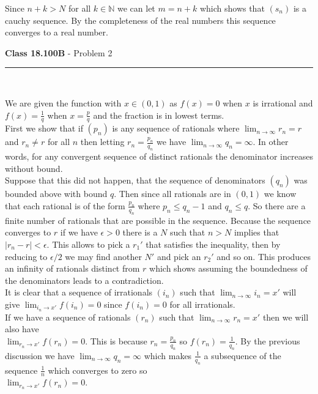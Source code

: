 \documentclass[11pt,reqno]{article}
\begin{document}
Since $n+k > N$ for all $k \in \mathbb{N}$ we can let $m = n+k$ which shows that $(s_n)$ is a cauchy sequence. By the completeness of the real numbers this sequence converges to a real number.


\newpage
\vspace{15pt}
\begin{flushleft} 
\textbf{Class 18.100B} - Problem 2\\
\rule{500pt}{1pt}\\
\end{flushleft} 

We are given the function with $x \in (0,1)$ as $f(x) = 0$ when $x$ is irrational and $f(x) = \frac{1}{q}$ when $x = \frac{p}{q}$ and the fraction is in lowest terms. \\
\indent First we show that if $(p_n)$ is any sequence of rationals where $\lim_{n \to \infty} r_n = r$ and $r_n \neq r$ for all $n$ then letting $r_n = \frac{p_n}{q_n}$ we have $\lim_{n \to \infty} q_n = \infty$. In other words, for any convergent sequence of distinct rationals the denominator increases without bound.\\
\indent Suppose that this did not happen, that the sequence of denominators $(q_n)$ was bounded above with bound $q$. Then since all rationals are in $(0,1)$ we know that each rational is of the form $\frac{p_n}{q_n}$ where $p_n \le q_n -1$ and $q_n \le q$. So there are a finite number of rationals that are possible in the sequence. Because the sequence converges to $r$ if we have $\epsilon > 0$ there is a $N$ such that $n > N$ implies that $|r_n - r| < \epsilon$. This allows to pick a $r_1'$ that satisfies the inequality, then by reducing to $\epsilon/2$ we may find another $N'$ and pick an $r_2'$ and so on. This produces an infinity of rationals distinct from $r$ which shows assuming the boundedness of the denominators leads to a contradiction. \\
\indent It is clear that a sequence of irrationals $(i_n)$ such that $\lim_{n \to \infty} i_n= x'$ will give $\lim_{i_n \to x'} f(i_n)  = 0$ since $f(i_n) = 0$ for all irrationals. \\
\indent If we have a sequence of rationals $(r_n)$ such that $\lim_{n \to \infty} r_n = x'$ then we will also have \\$\lim_{r_n \to x'} f(r_n)  = 0$. This is because $r_n = \frac{p_n}{q_n}$ so $f(r_n) = \frac{1}{q_n}$. By the previous discussion we have $\lim_{n \to \infty} q_n = \infty$ which makes $\frac{1}{q_n}$ a subsequence of the sequence $\frac{1}{n}$ which converges to zero so \\ $\lim_{r_n \to x'} f(r_n)  = 0$.\\
\end{document}
